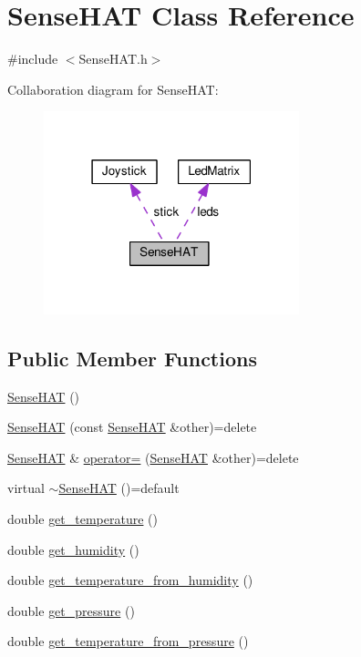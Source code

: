 \hypertarget{class_sense_h_a_t}{}\section{Sense\+H\+AT Class Reference}
\label{class_sense_h_a_t}


{\ttfamily \#include $<$Sense\+H\+A\+T.\+h$>$}



Collaboration diagram for Sense\+H\+AT\+:\nopagebreak
\begin{figure}[H]
\begin{center}
\leavevmode
\includegraphics[width=210pt]{class_sense_h_a_t__coll__graph}
\end{center}
\end{figure}
\subsection*{Public Member Functions}
\begin{DoxyCompactItemize}
\item 
\hyperlink{class_sense_h_a_t_a6f1b370e30d524ee6bccaa19c5566fbe}{Sense\+H\+AT} ()
\item 
\hyperlink{class_sense_h_a_t_a39f7095d97dd434479c05e85bdc32952}{Sense\+H\+AT} (const \hyperlink{class_sense_h_a_t}{Sense\+H\+AT} \&other)=delete
\item 
\hyperlink{class_sense_h_a_t}{Sense\+H\+AT} \& \hyperlink{class_sense_h_a_t_aa05efe7c4e0933067e3b655470dfd6df}{operator=} (\hyperlink{class_sense_h_a_t}{Sense\+H\+AT} \&other)=delete
\item 
virtual \hyperlink{class_sense_h_a_t_a1af79051ee9d294203278d8d3f22036a}{$\sim$\+Sense\+H\+AT} ()=default
\item 
double \hyperlink{class_sense_h_a_t_ae0d2f1c110a5dfe453bdb2f22cf719c0}{get\+\_\+temperature} ()
\item 
double \hyperlink{class_sense_h_a_t_a270dbefc2b736c1ef3dfc996f968611f}{get\+\_\+humidity} ()
\item 
double \hyperlink{class_sense_h_a_t_af1ffda111c9826f7eb3b88aa0ea29a00}{get\+\_\+temperature\+\_\+from\+\_\+humidity} ()
\item 
double \hyperlink{class_sense_h_a_t_a6fcb3739537d351a60375a8aa8309a4e}{get\+\_\+pressure} ()
\item 
double \hyperlink{class_sense_h_a_t_abe8f9a29726dbfeac2bd45cff6f8a984}{get\+\_\+temperature\+\_\+from\+\_\+pressure} ()
\end{DoxyCompactItemize}
